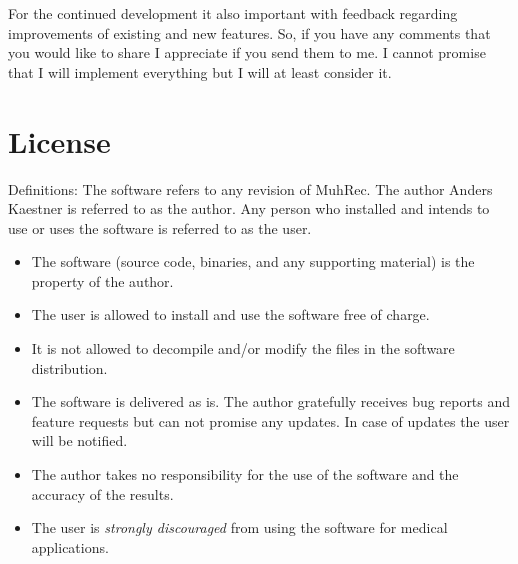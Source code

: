 \documentclass[a4paper]{scrreprt}
\begin{document}
For the continued development it also important with feedback regarding
improvements of existing and new features. So, if you have any comments that you
would like to share I appreciate if you send them to me. I cannot promise that I
will implement everything but I will at least consider it.



\appendix
\chapter{License}
Definitions: The software refers to any revision of MuhRec. The author Anders
Kaestner is referred to as the author. Any person who installed and intends to
use or uses the software is referred to as the user.
\begin{itemize}
\item The software (source code, binaries, and any supporting material) is the property of the author.
\item The user is allowed to install and use the software free of charge.
\item It is not allowed to decompile and/or modify the files in the software distribution.
\item The software is delivered as is. The author gratefully receives bug
reports and feature requests but can not promise any updates. In case of updates
the user will be notified.
\item The author takes no responsibility for the use of the software and the
accuracy of the results.
\item The user is \emph{strongly discouraged} from using the software for
medical applications.
\end{itemize}
\end{document}
